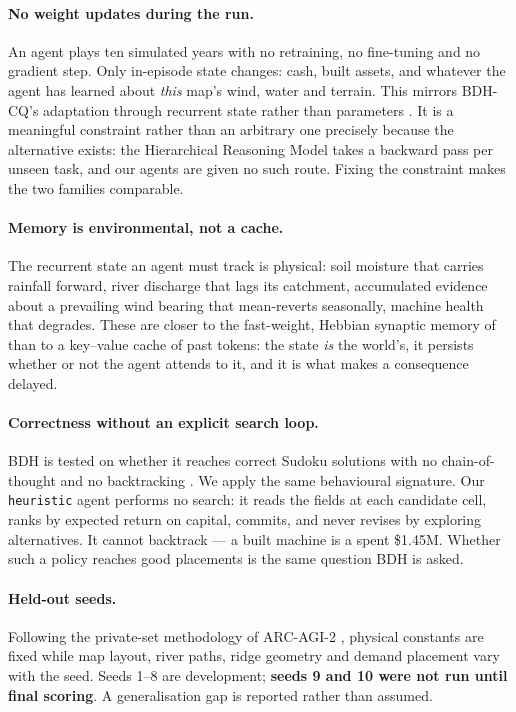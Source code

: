 \documentclass{article}
\begin{document}
\paragraph{No weight updates during the run.} An agent plays ten simulated years
with no retraining, no fine-tuning and no gradient step. Only in-episode state
changes: cash, built assets, and whatever the agent has learned about
\emph{this} map's wind, water and terrain. This mirrors BDH-CQ's adaptation
through recurrent state rather than parameters \citep{engdahl2026bdhcq}. It is a
meaningful constraint rather than an arbitrary one precisely because the
alternative exists: the Hierarchical Reasoning Model \citep{wang2025hrm} takes a
backward pass per unseen task, and our agents are given no such route. Fixing
the constraint makes the two families comparable.

\paragraph{Memory is environmental, not a cache.} The recurrent state an agent
must track is physical: soil moisture that carries rainfall forward, river
discharge that lags its catchment, accumulated evidence about a prevailing wind
bearing that mean-reverts seasonally, machine health that degrades. These are
closer to the fast-weight, Hebbian synaptic memory of \citet{kosowski2025bdh}
than to a key--value cache of past tokens: the state \emph{is} the world's, it
persists whether or not the agent attends to it, and it is what makes a
consequence delayed.

\paragraph{Correctness without an explicit search loop.} BDH is tested on
whether it reaches correct Sudoku solutions with no chain-of-thought and no
backtracking \citep{kosowski2025bdh}. We apply the same behavioural signature.
Our \texttt{heuristic} agent performs no search: it reads the fields at each
candidate cell, ranks by expected return on capital, commits, and never revises
by exploring alternatives. It cannot backtrack --- a built machine is a spent
\$1.45M. Whether such a policy reaches good placements is the same question BDH
is asked.

\paragraph{Held-out seeds.} Following the private-set methodology of
ARC-AGI-2 \citep{chollet2025arcagi2}, physical constants are fixed while map
layout, river paths, ridge geometry and demand placement vary with the seed.
Seeds 1--8 are development; \textbf{seeds 9 and 10 were not run until final
scoring}. A generalisation gap is reported rather than assumed.
\end{document}
